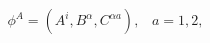 \begin{equation}
\phi ^{A}=(A^{i},B^{\alpha },C^{\alpha a}),\;\;\;a=1,2,  \label{flds}
\end{equation}

